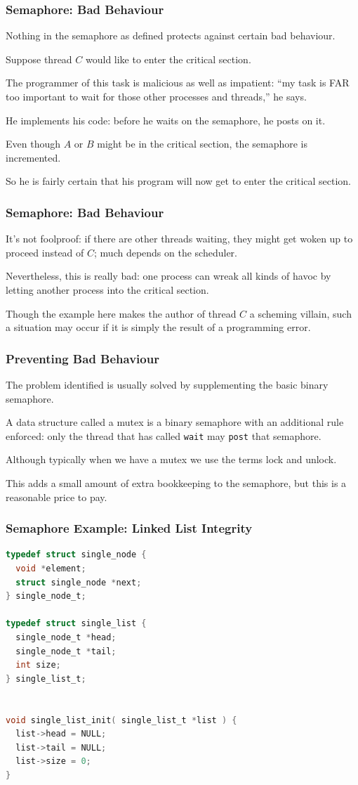 \begin{frame}
	\frametitle{Semaphore: Bad Behaviour}

	Nothing in the semaphore as defined protects against certain bad behaviour.

	Suppose thread $C$ would like to enter the critical section.

	The programmer of this task is malicious as well as impatient: ``my task is FAR too important to wait for those other processes and threads,'' he says.

	He implements his code: before he waits on the semaphore, he posts on it.

	Even though $A$ or $B$ might be in the critical section, the semaphore is incremented.

	So he is fairly certain that his program will now get to enter the critical section.
\end{frame}

\begin{frame}
	\frametitle{Semaphore: Bad Behaviour}

	It's not foolproof: if there are other threads waiting, they might get woken up to proceed instead of $C$; much depends on the scheduler.

	Nevertheless, this is really bad: one process can wreak all kinds of havoc by letting another process into the critical section.

	Though the example here makes the author of thread $C$ a scheming villain, such a situation may occur if it is simply the result of a programming error.

\end{frame}

\begin{frame}
	\frametitle{Preventing Bad Behaviour}

	The problem identified is usually solved by supplementing the basic binary semaphore.

	A data structure called a \alert{mutex} is a binary semaphore with an additional rule enforced: only the thread that has called \texttt{wait} may \texttt{post} that semaphore.

	Although typically when we have a mutex we use the terms \alert{lock} and \alert{unlock}.

	This adds a small amount of extra bookkeeping to the semaphore, but this is a reasonable price to pay.

\end{frame}

\begin{frame}[fragile]
	\frametitle{Semaphore Example: Linked List Integrity}

	\begin{lstlisting}[language=C]
typedef struct single_node {
  void *element;
  struct single_node *next;
} single_node_t;

typedef struct single_list {
  single_node_t *head;
  single_node_t *tail;
  int size;
} single_list_t;


void single_list_init( single_list_t *list ) {
  list->head = NULL;
  list->tail = NULL;
  list->size = 0;
}
\end{lstlisting}
\end{frame}

